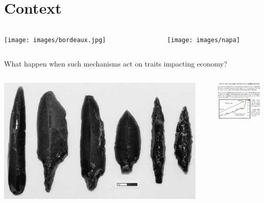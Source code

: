 \documentclass[12pt, handout=show,notes=show]{beamer}
\begin{document}
\section{Context}


\begin{frame}
	\begin{columns}
		\begin{column}{.3\textwidth}
			\texttt{[image: images/bordeaux.jpg]}	
		\end{column}
		\begin{column}{.2\textwidth}
		\end{column}
		\begin{column}{.3\textwidth}
			\texttt{[image: images/napa]}	
		\end{column}
	\end{columns}
	\begin{center}
		What happen when such mechanisms act on traits impacting economy?
	\end{center}
	\begin{columns}
		\begin{column}{.3\textwidth}
			\includegraphics[width=\textwidth]{images/tools}	
		\end{column}
		\begin{column}{.2\textwidth}
		\end{column}
		\begin{column}{.3\textwidth}
			\includegraphics[width=3cm]{images/stockoption}	
		\end{column}
	\end{columns}
\end{frame}
\end{document}
